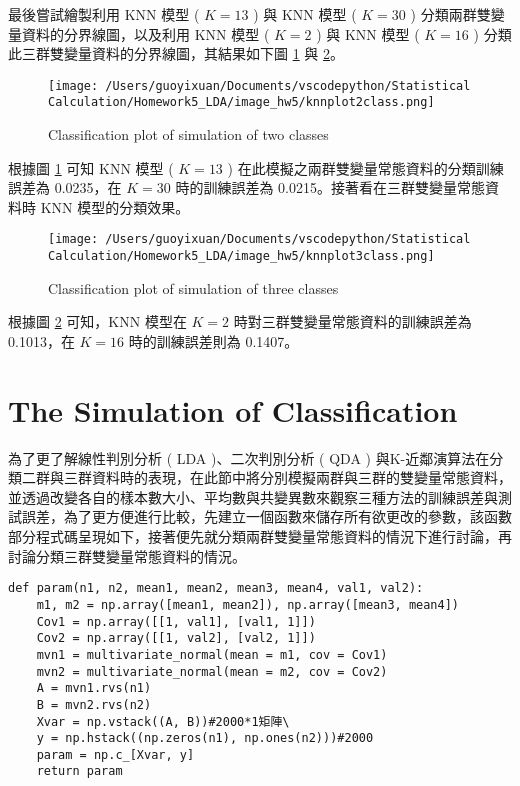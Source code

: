 最後嘗試繪製利用 KNN 模型 ( $K = 13$ ) 與 KNN 模型 ( $K = 30$ ) 分類兩群雙變量資料的分界線圖，以及利用 KNN 模型 ( $K = 2$ ) 與 KNN 模型 ( $K = 16$ ) 分類此三群雙變量資料的分界線圖，其結果如下圖 \ref{fig:knn2class,k=1330} 與 \ref{fig:knn3class,k=216}。

\begin{figure}[H]
    \centering
        \texttt{[image: /Users/guoyixuan/Documents/vscodepython/Statistical Calculation/Homework5\_LDA/image\_hw5/knnplot2class.png]}
    \caption{Classification plot of simulation of two classes}
    \label{fig:knn2class,k=1330}
\end{figure} 

根據圖 \ref{fig:knn2class,k=1330} 可知 KNN 模型 ( $K = 13$ ) 在此模擬之兩群雙變量常態資料的分類訓練誤差為 0.0235，在 $K = 30$ 時的訓練誤差為 0.0215。接著看在三群雙變量常態資料時 KNN 模型的分類效果。


\begin{figure}[H]
    \centering
        \texttt{[image: /Users/guoyixuan/Documents/vscodepython/Statistical Calculation/Homework5\_LDA/image\_hw5/knnplot3class.png]}
    \caption{Classification plot of simulation of three classes}
    \label{fig:knn3class,k=216}
\end{figure} 

根據圖 \ref{fig:knn3class,k=216} 可知，KNN 模型在 $K = 2$ 時對三群雙變量常態資料的訓練誤差為 0.1013，在 $K = 16$ 時的訓練誤差則為 0.1407。

\section{The Simulation of Classification}

為了更了解線性判別分析 ( LDA )、二次判別分析 ( QDA ) 與K-近鄰演算法在分類二群與三群資料時的表現，在此節中將分別模擬兩群與三群的雙變量常態資料，並透過改變各自的樣本數大小、平均數與共變異數來觀察三種方法的訓練誤差與測試誤差，為了更方便進行比較，先建立一個函數來儲存所有欲更改的參數，該函數部分程式碼呈現如下，接著便先就分類兩群雙變量常態資料的情況下進行討論，再討論分類三群雙變量常態資料的情況。

\bigskip

\begin{lstlisting}
def param(n1, n2, mean1, mean2, mean3, mean4, val1, val2):
    m1, m2 = np.array([mean1, mean2]), np.array([mean3, mean4])
    Cov1 = np.array([[1, val1], [val1, 1]])
    Cov2 = np.array([[1, val2], [val2, 1]])
    mvn1 = multivariate_normal(mean = m1, cov = Cov1)
    mvn2 = multivariate_normal(mean = m2, cov = Cov2)
    A = mvn1.rvs(n1)
    B = mvn2.rvs(n2)
    Xvar = np.vstack((A, B))#2000*1矩陣\
    y = np.hstack((np.zeros(n1), np.ones(n2)))#2000
    param = np.c_[Xvar, y]
    return param
\end{lstlisting}


